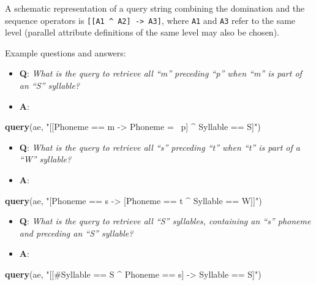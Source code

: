 \documentclass[]{book}
\newenvironment{Shaded}{\begin{snugshade}}{\end{snugshade}}
\newcommand{\KeywordTok}[1]{\textcolor[rgb]{0.13,0.29,0.53}{\textbf{#1}}}
\newcommand{\NormalTok}[1]{#1}
\newcommand{\StringTok}[1]{\textcolor[rgb]{0.31,0.60,0.02}{#1}}
\providecommand{\tightlist}{%
  \setlength{\itemsep}{0pt}\setlength{\parskip}{0pt}}
\theoremstyle{definition}
\theoremstyle{definition}
\theoremstyle{definition}
\theoremstyle{remark}
\begin{document}
A schematic representation of a query string combining the domination
and the sequence operators is
\texttt{{[}{[}A1\ \^{}\ A2{]}\ -\textgreater{}\ A3{]}}, where
\texttt{A1} and \texttt{A3} refer to the same level (parallel attribute
definitions of the same level may also be chosen).

Example questions and answers:

\begin{itemize}
\tightlist
\item
  \textbf{Q}: \emph{What is the query to retrieve all ``m'' preceding
  ``p'' when ``m'' is part of an ``S'' syllable?}
\item
  \textbf{A}:
\end{itemize}

\begin{Shaded}
\begin{Highlighting}[]
\KeywordTok{query}\NormalTok{(ae, }\StringTok{"[[Phoneme == m -> Phoneme =~ p] ^ Syllable == S]"}\NormalTok{)}
\end{Highlighting}
\end{Shaded}

\begin{itemize}
\tightlist
\item
  \textbf{Q}: \emph{What is the query to retrieve all ``s'' preceding
  ``t'' when ``t'' is part of a ``W'' syllable?}
\item
  \textbf{A}:
\end{itemize}

\begin{Shaded}
\begin{Highlighting}[]
\KeywordTok{query}\NormalTok{(ae, }\StringTok{"[Phoneme == s -> [Phoneme == t ^ Syllable == W]]"}\NormalTok{)}
\end{Highlighting}
\end{Shaded}

\begin{itemize}
\tightlist
\item
  \textbf{Q}: \emph{What is the query to retrieve all ``S'' syllables,
  containing an ``s'' phoneme and preceding an ``S'' syllable?}
\item
  \textbf{A}:
\end{itemize}

\begin{Shaded}
\begin{Highlighting}[]
\KeywordTok{query}\NormalTok{(ae, }\StringTok{"[[#Syllable == S ^ Phoneme == s] -> Syllable == S]"}\NormalTok{)}
\end{Highlighting}
\end{Shaded}
\end{document}
